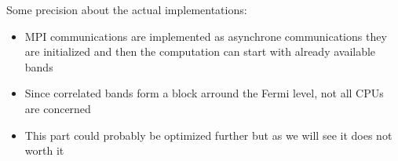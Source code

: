 \begin{frame}
  Some precision about the actual implementations:
  \begin{itemize}
    \item MPI communications are implemented as asynchrone communications they are
      initialized and then the computation can start with already available bands
    \item Since correlated bands form a block arround the Fermi level, not all CPUs
      are concerned
    \item This part could probably be optimized further but as we will see it does not worth it

  \end{itemize}
\end{frame}
